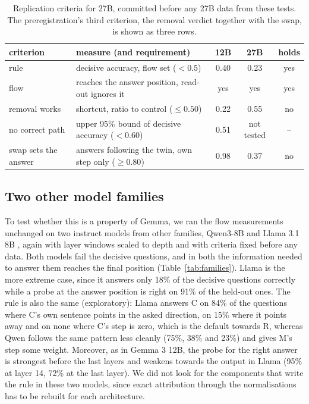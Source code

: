 \documentclass[11pt]{article}
\begin{document}
\begin{table}[t]
  \centering
  \small
  \caption{Replication criteria for 27B, committed before any 27B data from these tests. The preregistration's third
  criterion, the removal verdict together with the swap, is shown as three rows.}
  \label{tab:replication}
  \begin{tabular}{@{}llccc@{}}
    \toprule
    criterion & measure (and requirement) & 12B & 27B & holds \\
    \midrule
    rule & decisive accuracy, flow set ($<0.5$) & 0.40 & 0.23 & yes \\
    flow & reaches the answer position, read-out ignores it & yes & yes & yes \\
    removal works & shortcut, ratio to control ($\le 0.50$) & 0.22 & 0.55 & no \\
    no correct path & upper 95\% bound of decisive accuracy ($<0.60$) & 0.51 & not tested & -- \\
    swap sets the answer & answers following the twin, own step only ($\ge 0.80$) & 0.98 & 0.37 & no \\
    \bottomrule
  \end{tabular}
\end{table}

\subsection{Two other model families}\label{sec:families}
To test whether this is a property of Gemma, we ran the flow measurements unchanged on two instruct models from other
families, Qwen3-8B \citep{yang2025qwen3} and Llama 3.1 8B \citep{grattafiori2024llama3}, again with layer windows
scaled to depth and with criteria fixed before any data. Both models fail the decisive questions, and in both the
information needed to answer them reaches the final position (Table~\ref{tab:families}). Llama is the more extreme
case, since it answers only 18\% of the decisive questions correctly while a probe at the answer position is right on
91\% of the held-out ones. The rule is also the same (exploratory): Llama answers C on 84\% of the questions where C's
own sentence points in the asked direction, on 15\% where it points away and on none where C's step is zero, which is
the default towards R, whereas Qwen follows the same pattern less cleanly (75\%, 38\% and 23\%) and gives M's step some
weight. Moreover, as in Gemma 3 12B, the probe for the right answer is strongest before the last layers and weakens
towards the output in Llama (95\% at layer 14, 72\% at the last layer). We did not look for the components that write
the rule in these two models, since exact attribution through the normalisations has to be rebuilt for each
architecture.
\end{document}
